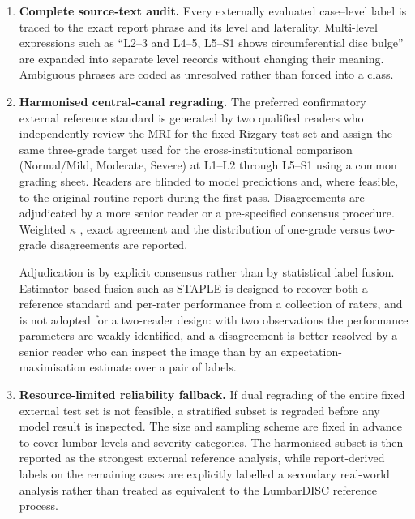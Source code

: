 \begin{enumerate}
  \item \textbf{Complete source-text audit.} Every externally evaluated
  case--level label is traced to the exact report phrase and its level and
  laterality. Multi-level expressions such as ``L2--3 and L4--5, L5--S1 shows
  circumferential disc bulge'' are expanded into separate level records without
  changing their meaning. Ambiguous phrases are coded as unresolved rather than
  forced into a class.

  \item \textbf{Harmonised central-canal regrading.} The preferred confirmatory
  external reference standard is generated by two qualified readers who
  independently review the MRI for the fixed Rizgary test set and assign the
  same three-grade target used for the cross-institutional comparison
  (Normal/Mild, Moderate, Severe) at L1--L2 through L5--S1 using a common grading
  sheet. Readers are blinded to model predictions and, where feasible, to the
  original routine report during the first pass. Disagreements are adjudicated
  by a more senior reader or a pre-specified consensus procedure. Weighted
  $\kappa$ \cite{cohen1968weighted}, exact agreement and the distribution of
  one-grade versus two-grade disagreements are reported.

  Adjudication is by explicit consensus rather than by statistical label
  fusion. Estimator-based fusion such as STAPLE
  \cite{warfield2004simultaneous} is designed to recover both a reference
  standard and per-rater performance from a collection of raters, and is not
  adopted for a two-reader design: with two observations the performance
  parameters are weakly identified, and a disagreement is better resolved by a
  senior reader who can inspect the image than by an expectation-maximisation
  estimate over a pair of labels.

  \item \textbf{Resource-limited reliability fallback.} If dual regrading of the
  entire fixed external test set is not feasible, a stratified subset is
  regraded before any model result is inspected. The size and sampling scheme
  are fixed in advance to cover lumbar levels and severity categories. The
  harmonised subset is then reported as the strongest external reference
  analysis, while report-derived labels on the remaining cases are explicitly
  labelled a secondary real-world analysis rather than treated as equivalent to
  the LumbarDISC reference process.
\end{enumerate}

